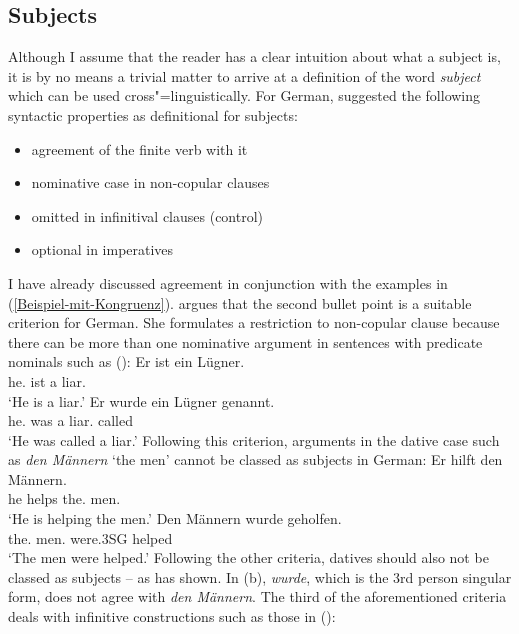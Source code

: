 \subsection{Subjects}
\label{Abschnitt-Subjekt}

Although I assume that the reader has a clear intuition about what a subject is, it is by no means a trivial matter to arrive at a definition of
the word \emph{subject} which can be used cross"=linguistically.
For German, \citet{Reis82} suggested the following syntactic properties as definitional for subjects:
\begin{itemize}
\item agreement of the finite verb with it
\item nominative case in non-copular clauses
\item omitted in infinitival clauses (control)
\item optional in imperatives
\end{itemize}
I have already discussed agreement in conjunction with the examples in
(\ref{Beispiel-mit-Kongruenz}). \citet{Reis82} argues that the second bullet point is a
suitable criterion for German. She formulates a restriction to non-copular clause because there
can be more than one nominative argument in sentences with predicate nominals such as ():
\eal
\ex
\gll Er ist ein Lügner.\\
     he.\nom{} ist a liar.\nom{}\\
\glt `He is a liar.'
\ex 
\gll Er wurde ein Lügner genannt.\\
     he.\nom{} was a liar.\nom{} called\\
\glt `He was called a liar.'
\zl
Following this criterion, arguments in the dative case such as \emph{den Männern} `the men' cannot be classed as subjects in German:
\eal
\ex 
\gll Er hilft den Männern.\\
	 he helps the.\dat{} men.\dat{}\\
\glt `He is helping the men.'
\ex
\label{bsp-den-maennern-wurde-geholfen}
\gll Den Männern wurde geholfen.\\
	 the.\dat{} men.\dat{} were.3SG helped\\
\glt `The men were helped.'
\zl
Following the other criteria, datives should also not be classed as subjects -- as \citet{Reis82} has shown.
In (b), \emph{wurde}, which is the 3rd person singular form, does not agree with \emph{den Männern}. The
third of the aforementioned criteria deals with infinitive constructions such as those in ():

